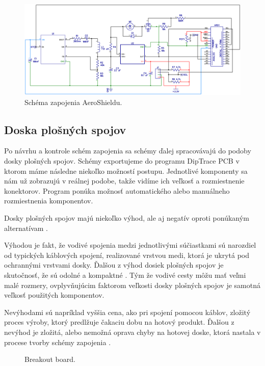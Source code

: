 \begin{figure}[!tbh]
	\includegraphics[width=\textwidth]{obr/aeroSchema.png}
	\caption{Schéma zapojenia AeroShieldu.}\label{OBRAZOK 2.3.5}
\end{figure}

\subsection{Doska plošných spojov}
\label{PCBcka}

Po návrhu a kontrole schém zapojenia sa schémy ďalej spracovávajú do podoby dosky plošných spojov. Schémy exportujeme do programu DipTrace PCB v ktorom máme následne niekoľko možností postupu. Jednotlivé komponenty sa nám už zobrazujú v reálnej podobe, takže vidíme ich veľkosť a rozmiestnenie konektorov. Program ponúka možnosť automatického alebo manuálneho rozmiestnenia komponentov.

Dosky plošných spojov majú niekoľko výhod, ale aj negatív oproti ponúkaným alternatívam \cite{dosky}. 

Výhodou je fakt, že vodivé spojenia medzi jednotlivými súčiastkami sú narozdiel od typických káblových spojení, realizované vrstvou medi, ktorá je ukrytá pod ochrannými vrstvami dosky. Ďalšou z výhod dosiek plošných spojov je skutočnosť, že sú odolné a kompaktné \cite{PCBlife}. Tým že vodivé cesty môžu mať veľmi malé rozmery, ovplyvňujúcim faktorom veľkosti dosky plošných spojov je samotná veľkosť použitých komponentov. 

Nevýhodami sú napríklad vyššia cena, ako pri spojení pomocou káblov, zložitý proces výroby, ktorý predlžuje čakaciu dobu na hotový produkt. Ďalšou z nevýhod je zložitá, alebo nemožná oprava chyby na hotovej doske, ktorá nastala v procese tvorby schémy zapojenia . 

\begin{figure}[!tbh]
	\hfill
	\hfill
	\hfill
	\caption{Breakout board.}\label{OBRAZOK 2.6}
\end{figure}

